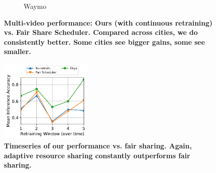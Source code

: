 \begin{figure}
\begin{subfigure}[t]{0.5\linewidth}
     \caption{\small Waymo}
    \label{fig:multicam-cities-waymo}
  \end{subfigure}
  \caption{\bf\small Multi-video performance: Ours (with continuous retraining) vs. Fair Share Scheduler. Compared across cities, we do consistently better. Some cities see bigger gains, some see smaller.}
  \label{fig:multicam-cities}
\end{figure}


\begin{figure}
	\includegraphics[width=0.4\textwidth]{results/multicam/multicam_taskwise_acc_zurich_4_cityscapes.pdf}
	\caption{\small \bf Timeseries of our performance vs. fair sharing. Again, adaptive resource sharing constantly outperforms fair sharing. }
	\label{fig:multicam-timeseries}
\end{figure}


